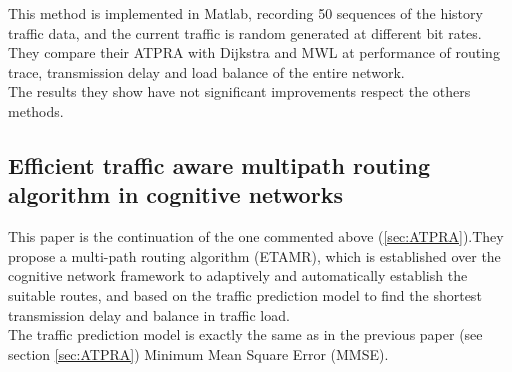 
This method is implemented in Matlab, recording 50 sequences of the history traffic data, and the current traffic is random generated at different bit rates.\\

They compare their ATPRA with Dijkstra and MWL at performance of routing trace, transmission delay and load balance of the entire network.\\

The results they show have not significant improvements respect the others methods.

\subsection{Efficient traffic aware multipath routing algorithm in cognitive networks}
\label{sec:ETAMR}

This paper\cite{ETAMR} is the continuation of the one commented above (\ref{sec:ATPRA}).They propose a multi-path routing algorithm (ETAMR), which is established over the cognitive network framework to adaptively and automatically establish the suitable routes, and based on the traffic prediction model to find the shortest transmission delay and balance in traffic load.\\

The traffic prediction model is exactly the same as in the previous paper \cite{ATPRA} (see section \ref{sec:ATPRA}) Minimum Mean Square Error (MMSE).\\


